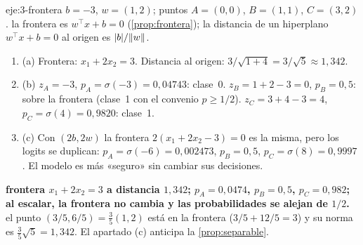 \begin{solucion}{eje:3-frontera}
\datos $b=-3$, $w=(1,2)$; puntos $A=(0,0)$, $B=(1,1)$, $C=(3,2)$.
\planteamiento la frontera es $w^{\top}x+b=0$ (\cref{prop:frontera}); la distancia de un hiperplano $w^{\top}x+b=0$ al origen es $\lvert b\rvert/\lVert w\rVert$.
\pasos
\begin{enumerate}[label=\arabic*.]
  \item (a) Frontera: $x_1+2x_2=3$. Distancia al origen: $3/\sqrt{1+4}=3/\sqrt5\approx 1{,}342$.
  \item (b) $z_A=-3$, $p_A=\sigma(-3)=0{,}04743$: clase~0. $z_B=1+2-3=0$, $p_B=0{,}5$: sobre la frontera (clase~1 con el convenio $p\ge 1/2$). $z_C=3+4-3=4$, $p_C=\sigma(4)=0{,}9820$: clase~1.
  \item (c) Con $(2b,2w)$ la frontera $2(x_1+2x_2-3)=0$ es la misma, pero los logits se duplican: $p_A=\sigma(-6)=0{,}002473$, $p_B=0{,}5$, $p_C=\sigma(8)=0{,}9997$. El modelo es más «seguro» sin cambiar sus decisiones.
\end{enumerate}
\resultado \textbf{frontera $x_1+2x_2=3$ a distancia $1{,}342$; $p_A=0{,}0474$, $p_B=0{,}5$, $p_C=0{,}982$; al escalar, la frontera no cambia y las probabilidades se alejan de $1/2$.}
\comprobacion el punto $(3/5,6/5)=\frac{3}{5}(1,2)$ está en la frontera ($3/5+12/5=3$) y su norma es $\frac35\sqrt5=1{,}342$. El apartado (c) anticipa la \cref{prop:separable}.
\end{solucion}

